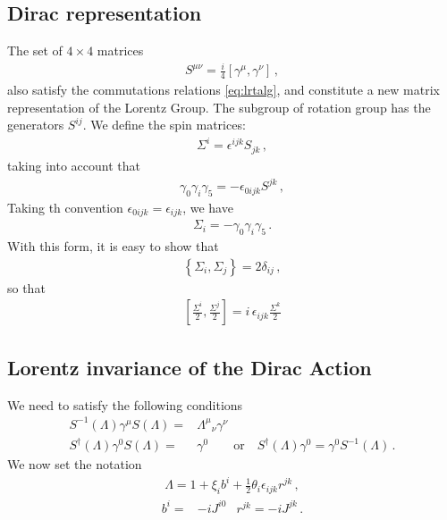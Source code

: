\begin{inprogress}
  \subsection{Dirac representation}
The set of $4\times 4$ matrices
\begin{align}
  S^{\mu\nu}=\frac{i}{4}\left[\gamma^\mu,\gamma^\nu\right]\,,
\end{align}
also satisfy the commutations relations \eqref{eq:lrtalg}, and constitute a new matrix representation of the Lorentz Group. The subgroup of rotation group has the generators $S^{ij}$. We define the spin matrices:
\begin{align}
  \Sigma^i=\epsilon^{ijk}S_{jk}\,,
\end{align}
taking into account that
\begin{align}
  \gamma_0\gamma_i\gamma_5=-\epsilon_{0ijk}S^{jk}\,,
\end{align}
Taking th convention $\epsilon_{0ijk}=\epsilon_{ijk}$, we have
\begin{align}
  \Sigma_{i}=-\gamma_0\gamma_i\gamma_5\,.
\end{align}
With this form, it is easy to show that
\begin{align}
  \left\{\Sigma_i,\Sigma_j\right\}=2\delta_{ij}\,, 
\end{align}
so that 
\begin{align}
  \left[\frac{\Sigma^i}{2},\frac{\Sigma^j}{2} \right]=i\,\epsilon_{ijk}\frac{\Sigma^k}{2}
\end{align}
\end{inprogress}



\subsection{Lorentz invariance of the Dirac Action}
We need to satisfy the following conditions
\begin{align}
  S^{-1}(\Lambda) \gamma^\mu S(\Lambda)=&{\Lambda^\mu}_\nu\gamma^\nu\nonumber\\
  S^\dagger(\Lambda) \gamma^0 S(\Lambda)=&\gamma^0\qquad\text{or}\quad S^\dagger(\Lambda) \gamma^0= \gamma^0S^{-1}(\Lambda)\, .
\end{align}
We now set the notation
\begin{align}
\label{eq:lorentzrep}
  \Lambda=1+\xi_ib^i+\frac{1}{2}\theta_i\epsilon_{i j k}r^{jk}\,,
\end{align}
\begin{align}
 b^i=&-i J^{i0} & r^{jk}=-i J^{j k}\,.
\end{align}

